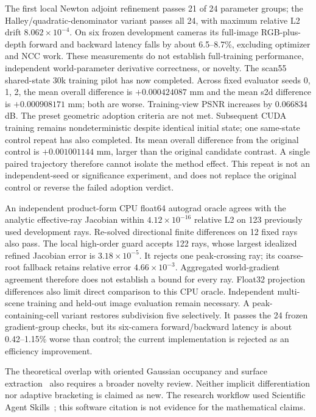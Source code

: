 \documentclass[11pt,a4paper]{article}
\begin{document}
The first local Newton adjoint refinement passes 21 of 24 parameter
groups; the Halley/quadratic-denominator variant passes all 24, with
maximum relative L2 drift $8.062\times10^{-4}$.
On six frozen development cameras its full-image RGB-plus-depth forward
and backward latency falls by about 6.5--8.7\%, excluding optimizer and
NCC work. These measurements do not establish full-training performance,
independent world-parameter derivative correctness, or novelty.
The scan55 shared-state 30k training pilot has now completed. Across
fixed evaluator seeds 0, 1, 2, the mean overall difference is
$+0.000424087$ mm and the mean s2d difference is $+0.000908171$ mm;
both are worse. Training-view PSNR increases by $0.066834$ dB.
The preset geometric adoption criteria are not met. Subsequent CUDA
training remains nondeterministic despite identical initial state;
one same-state control repeat has also completed. Its mean overall
difference from the original control is $+0.001001144$ mm, larger
than the original candidate contrast. A single paired trajectory
therefore cannot isolate the method effect. This repeat is not an
independent-seed or significance experiment, and does not replace
the original control or reverse the failed adoption verdict.

An independent product-form CPU float64 autograd oracle agrees with
the analytic effective-ray Jacobian within $4.12\times10^{-16}$
relative L2 on 123 previously used development rays. Re-solved
directional finite differences on 12 fixed rays also pass.
The local high-order guard accepts 122 rays, whose largest idealized
refined Jacobian error is $3.18\times10^{-5}$. It rejects one
peak-crossing ray; its coarse-root fallback retains relative error
$4.66\times10^{-3}$. Aggregated world-gradient agreement therefore
does not establish a bound for every ray. Float32 projection differences
also limit direct comparison to this CPU oracle. Independent multi-scene
training and held-out image evaluation remain necessary.
A peak-containing-cell variant restores subdivision five selectively.
It passes the 24 frozen gradient-group checks, but its six-camera
forward/backward latency is about 0.42--1.15\% worse than control;
the current implementation is rejected as an efficiency improvement.

The theoretical overlap with oriented Gaussian occupancy and surface
extraction~\cite{wrapping} also requires a broader novelty review.
Neither implicit differentiation nor adaptive bracketing is claimed as new.
The research workflow used Scientific Agent Skills~\cite{skills}; this
software citation is not evidence for the mathematical claims.
\end{document}
